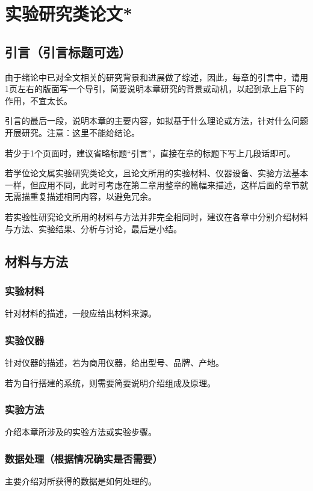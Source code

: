 \chapter{实验研究类论文*}
\label{cha:thirdsection}


\section{引言（引言标题可选）}
\label{sec:method}
由于绪论中已对全文相关的研究背景和进展做了综述，因此，每章的引言中，请用1页左右的版面写一个导引，简要说明本章研究的背景或动机，以起到承上启下的作用，不宜太长。

引言的最后一段，说明本章的主要内容，如拟基于什么理论或方法，针对什么问题开展研究。注意：这里不能给结论。

若少于1个页面时，建议省略标题“引言”，直接在章的标题下写上几段话即可。

若学位论文属实验研究类论文，且论文所用的实验材料、仪器设备、实验方法基本一样，但应用不同，此时可考虑在第二章用整章的篇幅来描述，这样后面的章节就无需描重复描述相同内容，以避免冗余。

若实验性研究论文所用的材料与方法并非完全相同时，建议在各章中分别介绍材料与方法、实验结果、分析与讨论，最后是小结。



\section{材料与方法}
\label{sec:algorithm}

\subsection{实验材料}
针对材料的描述，一般应给出材料来源。

\subsection{实验仪器}
针对仪器的描述，若为商用仪器，给出型号、品牌、产地。

若为自行搭建的系统，则需要简要说明介绍组成及原理。

\subsection{实验方法}
介绍本章所涉及的实验方法或实验步骤。

\subsection{数据处理（根据情况确实是否需要）}
主要介绍对所获得的数据是如何处理的。


